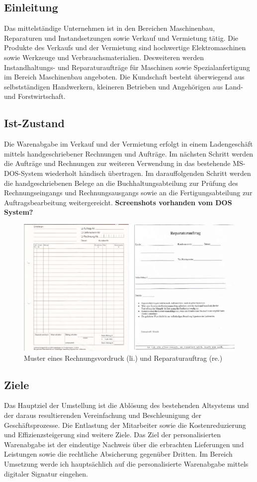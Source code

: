 \subsection{Einleitung}
Das mittelständige Unternehmen ist in den Bereichen Maschinenbau, Reparaturen und Instandsetzungen sowie Verkauf und Vermietung tätig. Die Produkte des Verkaufs und der Vermietung sind hochwertige Elektromaschinen sowie Werkzeuge und Verbrauchsmaterialien. Desweiteren werden Instandhaltungs- und Reparaturaufträge für Maschinen sowie Spezialanfertigung im Bereich Maschinenbau angeboten. Die Kundschaft besteht überwiegend aus selbstständigen Handwerkern, kleineren Betrieben und Angehörigen aus Land- und Forstwirtschaft. \cite{einleitung1}
\subsection{Ist-Zustand}
Die Warenabgabe im Verkauf und der Vermietung erfolgt in einem Ladengeschäft mittels handgeschriebener Rechnungen und Aufträge. Im nächsten Schritt werden die Aufträge und Rechnungen zur weiteren Verwendung in das bestehende MS-DOS-System wiederholt händisch übertragen. Im darauffolgenden Schritt werden die handgeschriebenen Belege an die Buchhaltungsabteilung zur Prüfung des Rechnungseingangs und Rechnungsausgangs sowie an die Fertigungsabteilung zur Auftragsbearbeitung weitergereicht. \textbf{Screenshots vorhanden vom DOS System?} \cite{einleitung1}
\begin{figure}[!ht]
    \centering
    \includegraphics{rechnungReparaturAlt2.png}
    \caption[Muster Rechnungsvordruck und Reparaturauftrag]{\small{Muster eines Rechnungsvordruck (li.) und Reparaturauftrag (re.) \cite{einleitung1}}}
    \label{fig:4}
\end{figure}
\subsection{Ziele}
Das Hauptziel der Umstellung ist die Ablösung des bestehenden Altsystems und der daraus resultierenden Vereinfachung und Beschleunigung der Geschäftsprozesse. Die Entlastung der Mitarbeiter sowie die Kostenreduzierung und Effizienzsteigerung sind weitere Ziele. Das Ziel der personalisierten Warenabgabe ist der eindeutige Nachweis über die erbrachten Lieferungen und Leistungen sowie die rechtliche Absicherung gegenüber Dritten. Im Bereich Umsetzung werde ich hauptsächlich auf die personalisierte Warenabgabe mittels digitaler Signatur eingehen. \cite{einleitung1}